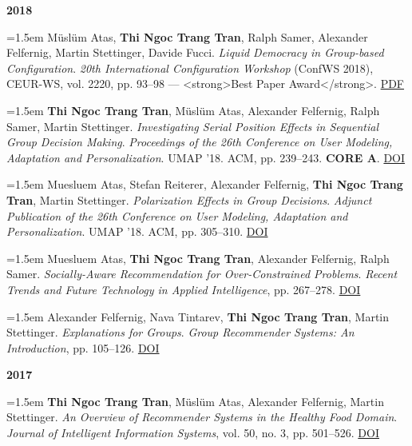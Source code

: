 \documentclass[11pt,a4paper]{article}
\newcommand{\pub}[1]{%
  \par\noindent\hangindent=1.5em\hangafter=1 #1\par\vspace{0.5ex}}
\newcommand{\pubyear}[1]{\vspace{0.7ex}\par\noindent\textbf{#1}\par\vspace{0.2ex}}
\begin{document}
\pubyear{2018}
\pub{Müslüm Atas, \textbf{Thi Ngoc Trang Tran}, Ralph Samer, Alexander Felfernig, Martin Stettinger, Davide Fucci. \textit{Liquid Democracy in Group-based Configuration}. \textit{20th International Configuration Workshop} (ConfWS 2018), CEUR-WS, vol. 2220, pp. 93–98 — <strong>Best Paper Award</strong>. \href{https://ceur-ws.org/Vol-2220/15_CONFWS18_paper_32.pdf}{PDF}}
\pub{\textbf{Thi Ngoc Trang Tran}, Müslüm Atas, Alexander Felfernig, Ralph Samer, Martin Stettinger. \textit{Investigating Serial Position Effects in Sequential Group Decision Making}. \textit{Proceedings of the 26th Conference on User Modeling, Adaptation and Personalization}. UMAP ’18. ACM, pp. 239–243. \textbf{CORE A}. \href{https://doi.org/10.1145/3209219.3209255}{DOI}}
\pub{Muesluem Atas, Stefan Reiterer, Alexander Felfernig, \textbf{Thi Ngoc Trang Tran}, Martin Stettinger. \textit{Polarization Effects in Group Decisions}. \textit{Adjunct Publication of the 26th Conference on User Modeling, Adaptation and Personalization}. UMAP ’18. ACM, pp. 305–310. \href{https://doi.org/10.1145/3213586.3225242}{DOI}}
\pub{Muesluem Atas, \textbf{Thi Ngoc Trang Tran}, Alexander Felfernig, Ralph Samer. \textit{Socially-Aware Recommendation for Over-Constrained Problems}. \textit{Recent Trends and Future Technology in Applied Intelligence}, pp. 267–278. \href{https://doi.org/10.1007/978-3-319-92058-0_25}{DOI}}
\pub{Alexander Felfernig, Nava Tintarev, \textbf{Thi Ngoc Trang Tran}, Martin Stettinger. \textit{Explanations for Groups}. \textit{Group Recommender Systems: An Introduction}, pp. 105–126. \href{https://doi.org/10.1007/978-3-319-75067-5_6}{DOI}}

\pubyear{2017}
\pub{\textbf{Thi Ngoc Trang Tran}, Müslüm Atas, Alexander Felfernig, Martin Stettinger. \textit{An Overview of Recommender Systems in the Healthy Food Domain}. \textit{Journal of Intelligent Information Systems}, vol. 50, no. 3, pp. 501–526. \href{https://doi.org/10.1007/s10844-017-0469-0}{DOI}}

\end{document}
